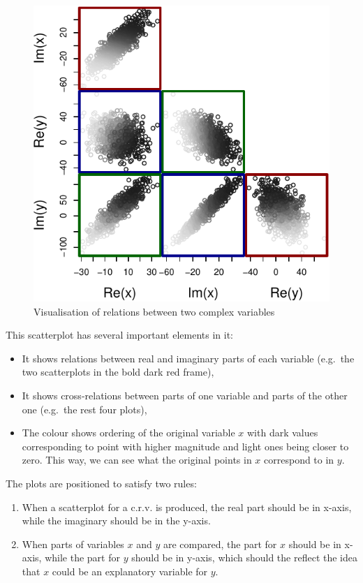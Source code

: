 \documentclass[
]{book}
\providecommand{\tightlist}{%
  \setlength{\itemsep}{0pt}\setlength{\parskip}{0pt}}
\begin{document}
\begin{figure}
\centering
\includegraphics{Svetunkov---Svetunkov---Complex-Dynamic-Models_files/figure-latex/crvScatterplots-1.pdf}
\caption{\label{fig:crvScatterplots}Visualisation of relations between two complex variables}
\end{figure}

This scatterplot has several important elements in it:

\begin{itemize}
\tightlist
\item
  It shows relations between real and imaginary parts of each variable (e.g.~the two scatterplots in the bold dark red frame),
\item
  It shows cross-relations between parts of one variable and parts of the other one (e.g.~the rest four plots),
\item
  The colour shows ordering of the original variable \(x\) with dark values corresponding to point with higher magnitude and light ones being closer to zero. This way, we can see what the original points in \(x\) correspond to in \(y\).
\end{itemize}

The plots are positioned to satisfy two rules:

\begin{enumerate}
\def\labelenumi{\arabic{enumi}.}
\tightlist
\item
  When a scatterplot for a c.r.v. is produced, the real part should be in x-axis, while the imaginary should be in the y-axis.
\item
  When parts of variables \(x\) and \(y\) are compared, the part for \(x\) should be in x-axis, while the part for \(y\) should be in y-axis, which should the reflect the idea that \(x\) could be an explanatory variable for \(y\).
\end{enumerate}
\end{document}
